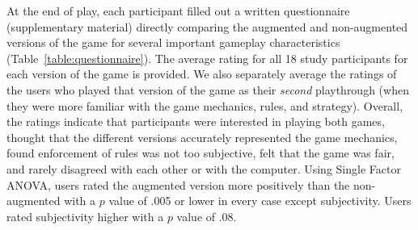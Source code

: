 \documentclass[10pt,twocolumn,letterpaper]{article}
\begin{document}
At the end of play, each participant filled out a written
questionnaire (supplementary material)
directly comparing the augmented and non-augmented versions of the
game 
for several important gameplay characteristics
%
(Table~\ref{table:questionnaire}).  The average rating for all 18 study
participants for each version of the game is provided.  We also
separately average the ratings of the users who played that version of
the game as their \emph{second} playthrough (when they were more
familiar with the game mechanics, rules, and strategy). 
%
Overall, the ratings indicate that participants were interested in
playing both games, thought that the different versions accurately represented the game mechanics,
found enforcement of rules was not too subjective,
felt that the game was fair, and rarely disagreed with each other or
with the computer.  
Using Single Factor ANOVA, users rated the augmented version 
more positively than the non-augmented with a $p$ value of .005 or lower in every 
case except subjectivity.  Users rated subjectivity higher with a $p$ value of .08.
\end{document}
